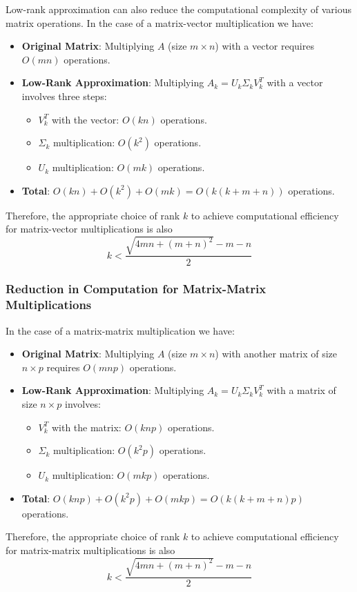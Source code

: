     Low-rank approximation can also reduce the computational complexity of various matrix operations. In the case of a matrix-vector multiplication we have:
    
    \begin{itemize}
        \item \textbf{Original Matrix}: Multiplying $A$ (size $m \times n$) with a vector requires $O(mn)$ operations.
        \item \textbf{Low-Rank Approximation}: Multiplying $A_k = U_k \Sigma_k V_k^T$ with a vector involves three steps:
        \begin{itemize}
            \item $V_k^T$ with the vector: $O(kn)$ operations.
            \item $\Sigma_k$ multiplication: $O(k^2)$ operations.
            \item $U_k$ multiplication: $O(mk)$ operations.
        \end{itemize}
        \item \textbf{Total}: $O(kn) + O(k^2) + O(mk) = O(k(k + m + n))$ operations.
    \end{itemize}
    Therefore, the appropriate choice of rank \(k\) to achieve computational efficiency for matrix-vector multiplications is also
    \begin{displaymath}
        k < \frac{\sqrt{4mn + (m+n)^2} - m - n}{2}
    \end{displaymath}
    
    \subsubsection{Reduction in Computation for Matrix-Matrix Multiplications}
    In the case of a matrix-matrix multiplication we have:
    
    \begin{itemize}
        \item \textbf{Original Matrix}: Multiplying $A$ (size $m \times n$) with another matrix of size $n \times p$ requires $O(mnp)$ operations.
        \item \textbf{Low-Rank Approximation}: Multiplying $A_k = U_k \Sigma_k V_k^T$ with a matrix of size $n \times p$ involves:
        \begin{itemize}
            \item $V_k^T$ with the matrix: $O(knp)$ operations.
            \item $\Sigma_k$ multiplication: $O(k^2 p)$ operations.
            \item $U_k$ multiplication: $O(mkp)$ operations.
        \end{itemize}
        \item \textbf{Total}: $O(knp) + O(k^2p) + O(mkp) = O(k(k + m + n)p)$ operations.
    \end{itemize}
    Therefore, the appropriate choice of rank \(k\) to achieve computational efficiency for matrix-matrix multiplications is also
    \begin{displaymath}
        k < \frac{\sqrt{4mn + (m+n)^2} - m - n}{2}
    \end{displaymath}
    
